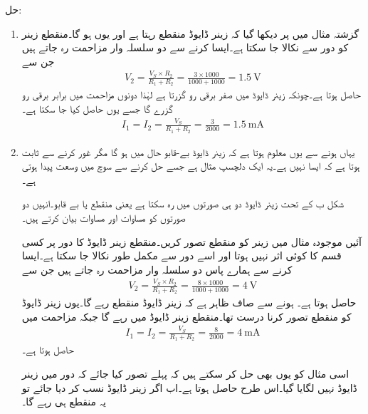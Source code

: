 حل: 
\begin{enumerate}
\item
گزشتہ مثال میں   پر دیکھا گیا کہ زینر ڈایوڈ منقطع رہتا ہے اور یوں   ہو گا۔منقطع زینر کو دور سے نکالا جا سکتا ہے۔ایسا کرنے سے دو سلسلہ وار مزاحمت رہ جاتے ہیں جن سے
\begin{align*}
V_2=\frac{V_S \times R_2}{R_1+R_2}=\frac{3 \times 1000}{1000+1000}=\SI{1.5}{\volt}
\end{align*}
حاصل ہوتا ہے۔چونکہ زینر ڈایوڈ میں صفر برقی رو گزرتا ہے لہٰذا دونوں مزاحمت میں برابر برقی رو گزرے گا جسے یوں حاصل کیا جا سکتا ہے۔
\begin{align*}
I_1=I_2=\frac{V_S}{R_1+R_2}=\frac{3}{2000}=\SI{1.5}{\milli \ampere}
\end{align*}
\item
یہاں   ہونے سے یوں معلوم ہوتا ہے کہ زینر ڈایوڈ بے-قابو حال میں ہو گا مگر غور کرنے سے ثابت ہوتا ہے کہ ایسا نہیں ہے۔یہ ایک دلچسپ مثال ہے جسے حل کرنے سے سوچ میں وسعت پیدا ہوتی ہے۔

شکل  ب کے تحت زینر ڈایوڈ دو ہی صورتوں میں رہ سکتا ہے یعنی منقطع یا بے قابو۔انہیں دو صورتوں کو مساوات   اور مساوات   بیان کرتے ہیں۔

آئیں موجودہ مثال میں زینر کو منقطع تصور کریں۔منقطع زینر ڈایوڈ کا دور پر کسی قسم کا کوئی اثر نہیں ہوتا اور اسے دور سے مکمل طور نکالا جا سکتا ہے۔ایسا کرنے سے ہمارے پاس دو سلسلہ وار مزاحمت رہ جاتے ہیں جن سے
\begin{align*}
V_2=\frac{V_S \times R_2}{R_1+R_2}=\frac{8 \times 1000}{1000+1000}=\SI{4}{\volt}
\end{align*}
حاصل ہوتا ہے۔   ہونے سے صاف ظاہر ہے کہ زینر ڈایوڈ منقطع رہے گا۔یوں زینر ڈایوڈ کو منقطع تصور کرنا درست تھا۔منقطع زینر ڈایوڈ میں  رہے گا جبکہ مزاحمت میں
\begin{align*}
I_1=I_2=\frac{V_S}{R_1+R_2}=\frac{8}{2000}=\SI{4}{\milli \ampere}
\end{align*}
حاصل ہوتا ہے۔

اسی مثال کو یوں بھی حل کر سکتے ہیں کہ پہلے تصور کیا جائے کہ دور میں زینر ڈایوڈ نہیں لگایا گیا۔اس طرح  حاصل ہوتا ہے۔اب اگر زینر ڈایوڈ نسب کر دیا جائے تو یہ منقطع ہی رہے گا۔


\end{enumerate}
